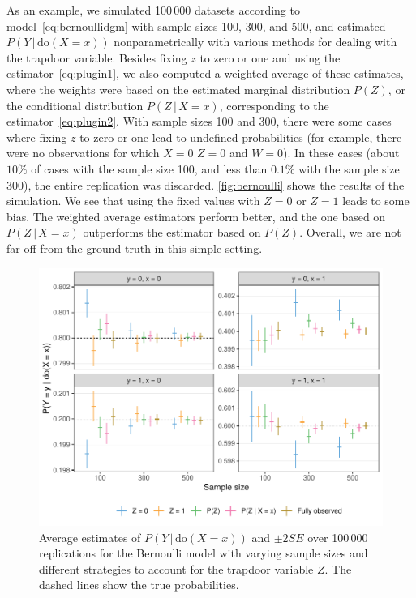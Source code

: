 \documentclass{statsoc}
\newcommand{\+}[1]{\ensuremath{\mathbf{#1}}}
\newcommand{\doo}{\textrm{do}}
\newcommand{\given}{{ \, | \, }}
\newcommand{\z}{trapdoor variable}
\begin{document}
As an example, we simulated 100\,000 datasets according to model~\eqref{eq:bernoullidgm} with sample sizes 100, 300, and 500, and estimated $P(Y\given \doo(X = x))$ nonparametrically with various methods for dealing with the \z. Besides fixing $z$ to zero or one and using the estimator~\autoref{eq:plugin1}, we also computed a weighted average of these estimates, where the weights were based on the estimated marginal distribution $P(Z)$, or the conditional distribution $P(Z \given X = x)$, corresponding to the estimator~\autoref{eq:plugin2}. With sample sizes 100 and 300, there were some cases where fixing $z$ to zero or one lead to undefined probabilities (for example, there were no observations for which $X = 0$ $Z = 0$ and $W = 0$). In these cases (about $10\%$ of cases with the sample size 100, and less than $0.1\%$ with the sample size 300), the entire replication was discarded. \autoref{fig:bernoulli} shows the results of the simulation. We see that using the fixed values with $Z=0$ or $Z=1$ leads to some bias. The weighted average estimators perform better, and the one based on $P(Z \given X = x)$ outperforms the estimator based on $P(Z)$. Overall, we are not far off from the ground truth in this simple setting.
\begin{figure}[!h]
	\centering
	\includegraphics[width=\textwidth]{figures/bernoulli.pdf} 
	\caption{Average estimates of $P(Y\given \doo(X = x))$ and $\pm 2 SE$ over 100\,000 replications for the Bernoulli model with varying sample sizes and different strategies to account for the \z{} $Z$. The dashed lines show the true probabilities.}
	\label{fig:bernoulli}
\end{figure}
\end{document}
